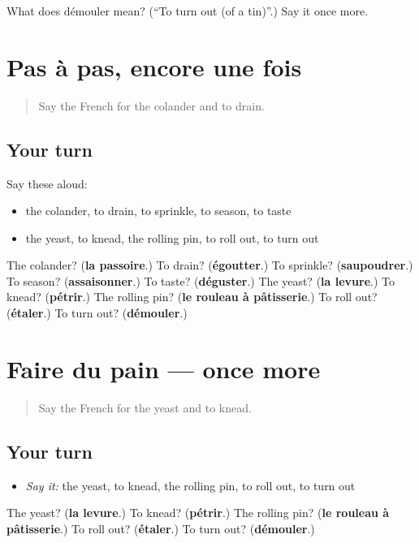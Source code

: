 \begin{tcolorbox}[breakable,colback=teal!4,colframe=teal!35!black,title={Before you move on}]
What does démouler mean? (\textquotedblleft{}To turn out (of a tin)\textquotedblright{}.) Say it once more.
\end{tcolorbox}
\section[(dialogue)]{Pas à pas, encore une fois}

\label{lesson:FR-R333-revision-332-333}



\begin{quote}
Say the French for the colander and to drain.
\end{quote}

\subsection*{Your turn}
Say these aloud:

\begin{itemize}
\raggedright
  \item the colander, to drain, to sprinkle, to season, to taste
  \item the yeast, to knead, the rolling pin, to roll out, to turn out
\end{itemize}

\begin{tcolorbox}[breakable,colback=teal!4,colframe=teal!35!black,title={Before you move on}]
The colander? (\textbf{la passoire}.) To drain? (\textbf{égoutter}.) To sprinkle? (\textbf{saupoudrer}.) To season? (\textbf{assaisonner}.) To taste? (\textbf{déguster}.) The yeast? (\textbf{la levure}.) To knead? (\textbf{pétrir}.) The rolling pin? (\textbf{le rouleau à pâtisserie}.) To roll out? (\textbf{étaler}.) To turn out? (\textbf{démouler}.)
\end{tcolorbox}
\section[(dialogue)]{Faire du pain — once more}

\label{lesson:FR-R333-revision-final-333}



\begin{quote}
Say the French for the yeast and to knead.
\end{quote}

\subsection*{Your turn}
\begin{itemize}
\raggedright
  \item \emph{Say it:} the yeast, to knead, the rolling pin, to roll out, to turn out
\end{itemize}

\begin{tcolorbox}[breakable,colback=teal!4,colframe=teal!35!black,title={Before you move on}]
The yeast? (\textbf{la levure}.) To knead? (\textbf{pétrir}.) The rolling pin? (\textbf{le rouleau à pâtisserie}.) To roll out? (\textbf{étaler}.) To turn out? (\textbf{démouler}.)
\end{tcolorbox}
